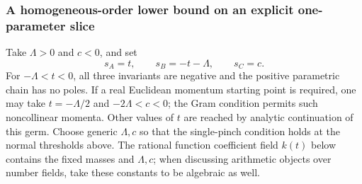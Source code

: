\documentclass[11pt,a4paper,oneside]{article}
\theoremstyle{plain}
\theoremstyle{definition}
\theoremstyle{remark}
\numberwithin{equation}{section}
\begin{document}
\subsubsection{A homogeneous-order lower bound on an explicit one-parameter slice}
Take $\Lambda>0$ and $c<0$, and set
\begin{equation}\label{unified:eq:scalariceray}
 s_A=t,\qquad s_B=-t-\Lambda,\qquad s_C=c.
\end{equation}
For $-\Lambda<t<0$, all three invariants are negative and the positive parametric chain has no poles.
If a real Euclidean momentum starting point is required, one may take $t=-\Lambda/2$ and
$-2\Lambda<c<0$; the Gram condition permits such noncollinear momenta.
Other values of $t$ are reached by analytic continuation of this germ.
Choose generic $\Lambda,c$ so that the single-pinch condition holds at the normal thresholds above.
The rational function coefficient field $k(t)$ below contains the fixed masses and $\Lambda,c$;
when discussing arithmetic objects over number fields, take these constants to be algebraic as well.
\end{document}
